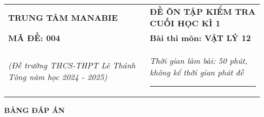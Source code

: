 \begin{tabular}{M{7cm}M{10.5cm}}
	\textbf{TRUNG TÂM MANABIE}& \textbf{ĐỀ ÔN TẬP KIỂM TRA CUỐI HỌC KÌ 1}\\
	\textbf{MÃ ĐỀ: 004}& \textbf{Bài thi môn: VẬT LÝ 12}\\
	\textit{(Đề trường THCS-THPT Lê Thánh Tông năm học 2024 - 2025)}& \textit{Thời gian làm bài: 50 phút, không kể thời gian phát đề}
	
	\noindent\rule{4cm}{0.8pt} \\
\end{tabular}
\setcounter{section}{0}
\begin{center}
	\textbf{\large BẢNG ĐÁP ÁN}
\end{center}
\section{}
\section{}
\section{}



